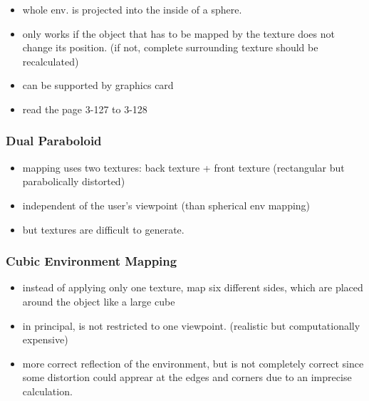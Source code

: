 \documentclass{standalone}
\begin{document}
\begin{itemize}
	\item whole env. is projected into the inside of a sphere.
	\item only works if the object that has to be mapped by the texture does not change its position. (if not, complete surrounding texture should be recalculated)
	\item can be supported by graphics card 
	\item read the page 3-127 to 3-128
\end{itemize}

\subsubsection*{Dual Paraboloid}

\begin{itemize}
	\item mapping uses two textures: back texture + front texture (rectangular but parabolically distorted)
	\item independent of the user's viewpoint (than spherical env mapping)
	\item but textures are difficult to generate.
\end{itemize}

\subsubsection*{Cubic Environment Mapping}

\begin{itemize}
	\item instead of applying only one texture, map six different sides, which are placed around the object like a large cube
	\item in principal, is not restricted to one viewpoint. (realistic but computationally expensive)
	\item more correct reflection of the environment, but is not completely correct since some distortion could apprear at the edges and corners due to an imprecise calculation. 
\end{itemize}
      
\end{document}
